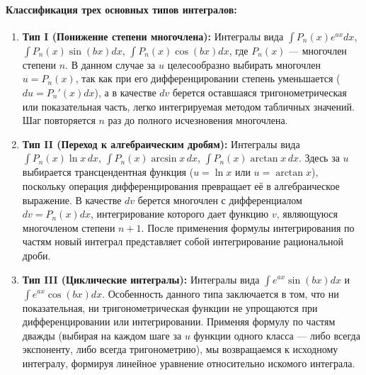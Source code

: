 \paragraph{Классификация трех основных типов интегралов:}
\begin{enumerate}
    \item \textbf{Тип I (Понижение степени многочлена):} Интегралы вида $\int P_n(x) e^{ax} dx$, $\int P_n(x) \sin(bx) dx$, $\int P_n(x) \cos(bx) dx$, где $P_n(x)$ — многочлен степени $n$. В данном случае за $u$ целесообразно выбирать многочлен $u = P_n(x)$, так как при его дифференцировании степень уменьшается ($du = P_n'(x)dx$), а в качестве $dv$ берется оставшаяся тригонометрическая или показательная часть, легко интегрируемая методом табличных значений. Шаг повторяется $n$ раз до полного исчезновения многочлена.
    
    \item \textbf{Тип II (Переход к алгебраическим дробям):} Интегралы вида $\int P_n(x) \ln x \, dx$, $\int P_n(x) \arcsin x \, dx$, $\int P_n(x) \arctan x \, dx$. Здесь за $u$ выбирается трансцендентная функция ($u = \ln x$ или $u = \arctan x$), поскольку операция дифференцирования превращает её в алгебраическое выражение. В качестве $dv$ берется многочлен с дифференциалом $dv = P_n(x)dx$, интегрирование которого дает функцию $v$, являющуюся многочленом степени $n+1$. После применения формулы интегрирования по частям новый интеграл представляет собой интегрирование рациональной дроби.
    
    \item \textbf{Тип III (Циклические интегралы):} Интегралы вида $\int e^{ax} \sin(bx) dx$ и $\int e^{ax} \cos(bx) dx$. Особенность данного типа заключается в том, что ни показательная, ни тригонометрическая функции не упрощаются при дифференцировании или интегрировании. Применяя формулу по частям дважды (выбирая на каждом шаге за $u$ функции одного класса — либо всегда экспоненту, либо всегда тригонометрию), мы возвращаемся к исходному интегралу, формируя линейное уравнение относительно искомого интеграла.
\end{enumerate}

